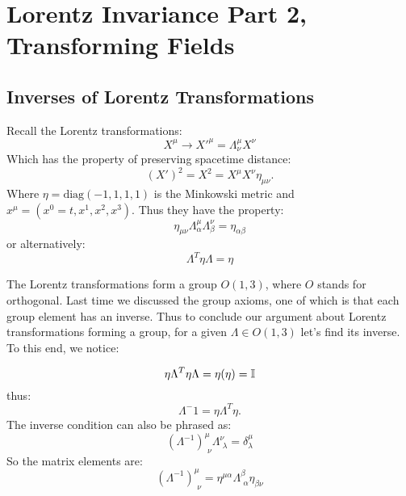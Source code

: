 \section{Lorentz Invariance Part 2, Transforming Fields}

\subsection{Inverses of Lorentz Transformations}
Recall the Lorentz transformations:
\begin{equation}
    X^\mu \to X'^\mu  = \Lambda^\mu_\nu X^\nu
\end{equation}
Which has the property of preserving spacetime distance:
\begin{equation}
    (X')^2 = X^2 = X^\mu X^\nu \eta_{\mu\nu}.
\end{equation}
Where $\eta = \text{diag}(-1, 1, 1, 1)$ is the Minkowski metric and $x^\mu = (x^0 = t, x^1, x^2, x^3)$. Thus they have the property:
\begin{equation}
    \eta_{\mu\nu}\Lambda^\mu_\alpha \Lambda^\nu_\beta = \eta_{\alpha\beta}
\end{equation}
or alternatively:
\begin{equation}
    \Lambda^T \eta \Lambda = \eta
\end{equation}

The Lorentz transformations form a group $O(1, 3)$, where $O$ stands for orthogonal. Last time we discussed the group axioms, one of which is that each group element has an inverse. Thus to conclude our argument about Lorentz transformations forming a group, for a given $\Lambda \in O(1, 3)$ let's find its inverse. To this end, we notice:

\begin{equation}
    \eta \Lambda^T \eta \Lambda = \eta(\eta) = \mathbb{I}
\end{equation}
thus:
\begin{equation}
    \Lambda^-1 = \eta \Lambda^T \eta.
\end{equation}
The inverse condition can also be phrased as:
\begin{equation}
    (\Lambda^{-1})^\mu_{\phantom{i}\nu} \Lambda^\nu_{\phantom{i}\lambda} = \delta^\mu_\lambda
\end{equation}
So the matrix elements are:
\begin{equation}
    (\Lambda^{-1})^\mu_{\phantom{i}\nu} = \eta^{\mu\alpha}\Lambda_{\phantom{i}\alpha}^\beta \eta_{\beta\nu}
\end{equation}

